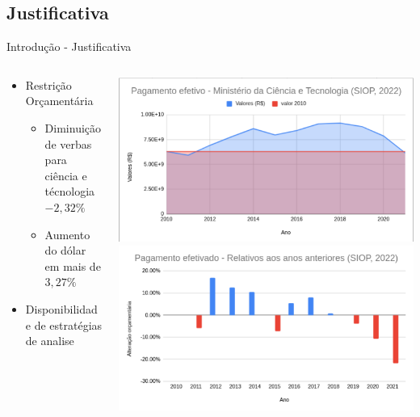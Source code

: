 \documentclass[10pt,brazil]{beamer}
\theoremstyle{definition}
\begin{document}
\subsection{Justificativa}

\begin{frame}{Introdução - Justificativa}
  \begin{columns}
    \begin{column}{0.5\textwidth}
      \begin{itemize}
        \item Restrição Orçamentária
              \begin{itemize}
                \item Diminuição de verbas para ciência e técnologia $-2,32\%$
                \item Aumento do dólar em mais de $3,27\%$
              \end{itemize}
        \item Disponibilidade de estratégias de analise
      \end{itemize}
    \end{column}
    \begin{column}{0.5\textwidth}  %
      \begin{center}
        \includegraphics[width=1\textwidth]{orcamento.png}
        \includegraphics[width=1\textwidth]{variacaoorcamentaria.png}
      \end{center}
    \end{column}
  \end{columns}
\end{frame}
\end{document}
